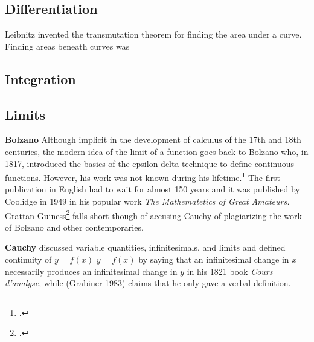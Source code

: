 {\subsection*{Differentiation}
Leibnitz invented the transmutation theorem for finding the area under a curve. Finding areas beneath curves
was 


\subsection*{Integration}

\subsection*{Limits}


\textbf{Bolzano} Although implicit in the development of calculus of the 17th and 18th centuries, the modern idea of the limit of a function goes back to Bolzano who, in 1817, introduced the basics of the epsilon-delta technique to define continuous functions. However, his work was not known during his lifetime.\footcite{coolidge} The first publication in English had to wait for almost 150 years and it was published by Coolidge in 1949 in his popular work \emph{The Mathematetics of Great Amateurs.} Grattan-Guiness\footcite{grattan-guiness} falls short though of accusing Cauchy of plagiarizing the work of Bolzano and other contemporaries.


\textbf{Cauchy} discussed variable quantities, infinitesimals, and limits and defined continuity of {$\displaystyle y=f(x)$} $y=f(x)$ by saying that an infinitesimal change in $x$ necessarily produces an infinitesimal change in $y$ in his 1821 book \emph{Cours d'analyse}, while (Grabiner 1983) claims that he only gave a verbal definition. 

}
